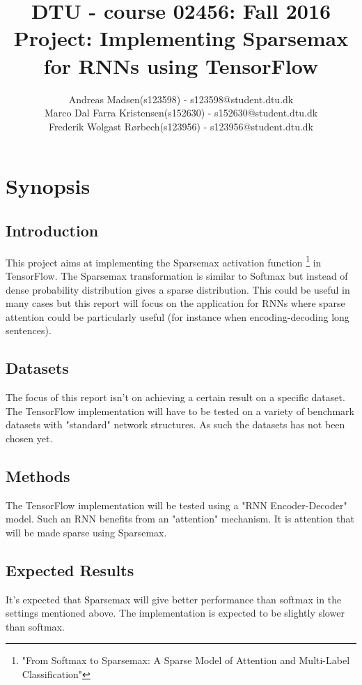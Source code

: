 \documentclass[a4paper]{article}
\title{	
\normalsize{DTU - course 02456: Fall 2016}\\
\Large Project: Implementing Sparsemax for RNNs using TensorFlow
}
\author
{ \normalsize
	Andreas Madsen(s123598) - s123598@student.dtu.dk\\
	Marco Dal Farra Kristensen(s152630) - s152630@student.dtu.dk\\
	Frederik Wolgast Rørbech(s123956) - s123956@student.dtu.dk
} %
\date{} %
\numberwithin{equation}{section}
\numberwithin{figure}{section}
\numberwithin{table}{section}
\begin{document}
\maketitle
\section*{Synopsis}
\subsection*{Introduction}
This project aims at implementing the Sparsemax activation function \footnote{"From Softmax to Sparsemax:
	A Sparse Model of Attention and Multi-Label Classification"} in TensorFlow. The Sparsemax transformation is similar to Softmax but instead of dense probability distribution gives a sparse distribution. This could be useful in many cases but this report will focus on the application for RNNs where sparse attention could be particularly useful (for instance when encoding-decoding long sentences).

\subsection*{Datasets}
The focus of this report isn't on achieving a certain result on a specific dataset. The TensorFlow implementation will have to be tested on a variety of benchmark datasets with "standard" network structures. As such the datasets has not been chosen yet.

\subsection*{Methods}
The TensorFlow implementation will be tested using a "RNN Encoder-Decoder" model. Such an RNN benefits from an "attention" mechanism. It is attention that will be made sparse using Sparsemax.

\subsection*{Expected Results}
It's expected that Sparsemax will give better performance than softmax in the settings mentioned above. The implementation is expected to be slightly slower than softmax.
\end{document}
